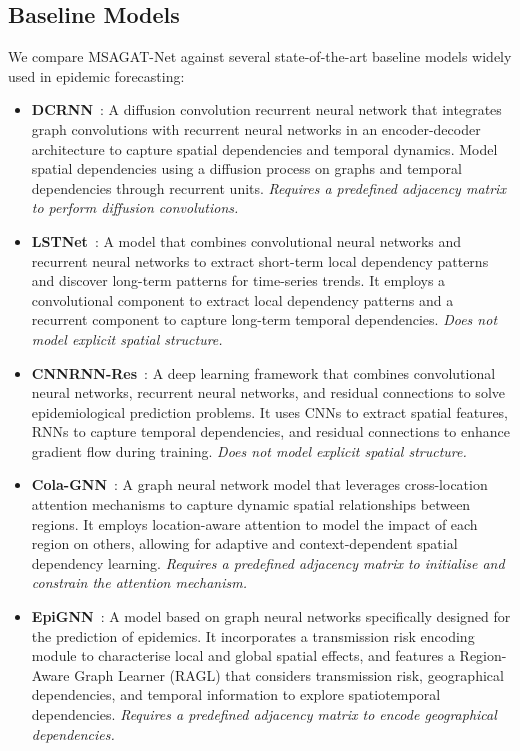 \documentclass[final,1p,times]{elsarticle}
\begin{document}
\subsection{Baseline Models}
\label{sec:baseline_models}

We compare MSAGAT-Net against several state-of-the-art baseline models widely used in epidemic forecasting:

\begin{itemize}
    \item \textbf{DCRNN}~\cite{li2017diffusion}: A diffusion convolution recurrent neural network that integrates graph convolutions with recurrent neural networks in an encoder-decoder architecture to capture spatial dependencies and temporal dynamics. Model spatial dependencies using a diffusion process on graphs and temporal dependencies through recurrent units. \textit{Requires a predefined adjacency matrix to perform diffusion convolutions.}
    
    \item \textbf{LSTNet}~\cite{lai2018modeling}: A model that combines convolutional neural networks and recurrent neural networks to extract short-term local dependency patterns and discover long-term patterns for time-series trends. It employs a convolutional component to extract local dependency patterns and a recurrent component to capture long-term temporal dependencies. \textit{Does not model explicit spatial structure.}
    
    \item \textbf{CNNRNN-Res}~\cite{wu2018deep}: A deep learning framework that combines convolutional neural networks, recurrent neural networks, and residual connections to solve epidemiological prediction problems. It uses CNNs to extract spatial features, RNNs to capture temporal dependencies, and residual connections to enhance gradient flow during training. \textit{Does not model explicit spatial structure.}
    
    \item \textbf{Cola-GNN}~\cite{dengColaGNNCrosslocationAttention2020a}: A graph neural network model that leverages cross-location attention mechanisms to capture dynamic spatial relationships between regions. It employs location-aware attention to model the impact of each region on others, allowing for adaptive and context-dependent spatial dependency learning. \textit{Requires a predefined adjacency matrix to initialise and constrain the attention mechanism.}
    
    \item \textbf{EpiGNN}~\cite{xie2022epignn}: A model based on graph neural networks specifically designed for the prediction of epidemics. It incorporates a transmission risk encoding module to characterise local and global spatial effects, and features a Region-Aware Graph Learner (RAGL) that considers transmission risk, geographical dependencies, and temporal information to explore spatiotemporal dependencies. \textit{Requires a predefined adjacency matrix to encode geographical dependencies.}
\end{itemize}
\end{document}

